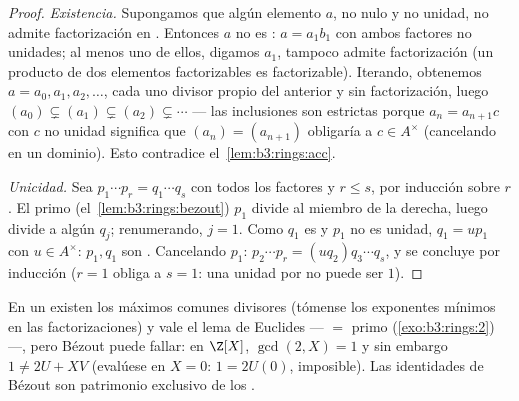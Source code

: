 \begin{proof}
\emph{Existencia.} Supongamos que algún elemento $a$, no nulo y no
unidad, no admite factorización en
. Entonces $a$ no es
: $a =
a_1b_1$ con ambos factores no unidades; al menos uno de ellos, digamos
$a_1$, tampoco admite factorización (un producto de dos elementos
factorizables es factorizable). Iterando, obtenemos $a = a_0, a_1, a_2,
\dots$, cada uno divisor propio del anterior y sin factorización, luego
$(a_0) \subsetneq (a_1) \subsetneq (a_2) \subsetneq \cdots$ --- las
inclusiones son estrictas porque $a_n = a_{n+1}c$ con $c$ no unidad
significa que $(a_n) = (a_{n+1})$ obligaría a $c \in A^\times$
(cancelando en un dominio). Esto contradice el~\cref{lem:b3:rings:acc}.

\emph{Unicidad.} Sea $p_1 \cdots p_r = q_1 \cdots q_s$ con todos los
factores  y $r \leq s$,
por inducción sobre $r$. El primo (el~\cref{lem:b3:rings:bezout}) $p_1$
divide al miembro de la derecha, luego divide a algún $q_j$;
renumerando, $j = 1$. Como $q_1$ es
 y $p_1$ no es unidad,
$q_1 = u p_1$ con $u \in A^\times$: $p_1,
q_1$ son . Cancelando
$p_1$: $p_2 \cdots p_r = (u q_2)
q_3\cdots q_s$, y se concluye por inducción ($r = 1$ obliga a $s = 1$:
una unidad por  no puede
ser $1$).
\end{proof}

\begin{remark}\label{rem:b3:rings:ufdgcd}
En un  existen los máximos comunes
divisores (tómense los exponentes mínimos en las factorizaciones) y vale
el lema de Euclides --- 
$=$ primo (\cref{exo:b3:rings:2}) ---, pero Bézout puede fallar: en
$\Z[X]$, $\gcd(2, X) = 1$ y sin embargo $1 \neq 2U + XV$ (evalúese en
$X = 0$: $1 = 2U(0)$, imposible). Las identidades de Bézout son
patrimonio exclusivo de los .
\end{remark}

